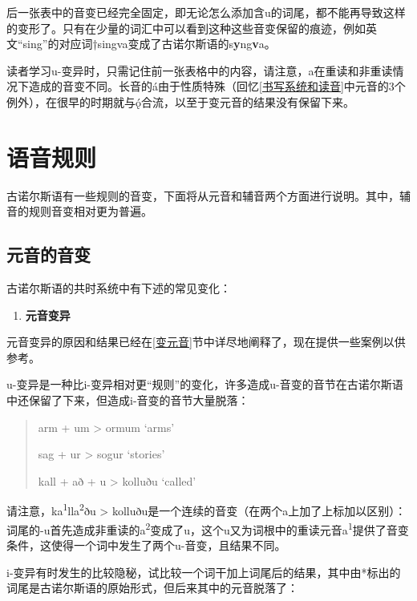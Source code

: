 后一张表中的音变已经完全固定，即无论怎么添加含u的词尾，都不能再导致这样的变形了。只有在少量的词汇中可以看到这种这些音变保留的痕迹，例如英文``sing''的对应词†singva变成了古诺尔斯语的s\textbf{y}ng\textbf{v}a。

读者学习u-变异时，只需记住前一张表格中的内容，请注意，a在重读和非重读情况下造成的音变不同。长音的á由于性质特殊（回忆\ref{书写系统和读音}中元音的3个例外），在很早的时期就与ǫ́合流，以至于变元音的结果没有保留下来。

\section{语音规则}\label{语音规则}

古诺尔斯语有一些规则的音变，下面将从元音和辅音两个方面进行说明。其中，辅音的规则音变相对更为普遍。

\subsection{元音的音变}\label{元音的音变}

古诺尔斯语的共时系统中有下述的常见变化：

\begin{enumerate}
  \def\labelenumi{\Alph{enumi}.}
  \item
        \label{_Ref117017033}{}\textbf{元音变异}
\end{enumerate}

元音变异的原因和结果已经在\ref{变元音}节中详尽地阐释了，现在提供一些案例以供参考。

u-变异是一种比i-变异相对更``规则''的变化，许多造成u-音变的音节在古诺尔斯语中还保留了下来，但造成i-音变的音节大量脱落：

\begin{quote}
  arm + um \textgreater{} ormum `arms'

  sag + ur \textgreater{} sogur `stories'

  kall + að + u \textgreater{} kolluðu `called'
\end{quote}

请注意，ka\textsuperscript{1}lla\textsuperscript{2}ðu \textgreater{}
kolluðu是一个连续的音变（在两个a上加了上标加以区别）：词尾的-u首先造成非重读的a\textsuperscript{2}变成了u，这个u又为词根中的重读元音a\textsuperscript{1}提供了音变条件，这使得一个词中发生了两个u-音变，且结果不同。

i-变异有时发生的比较隐秘，试比较一个词干加上词尾后的结果，其中由*标出的词尾是古诺尔斯语的原始形式，但后来其中的元音脱落了：

